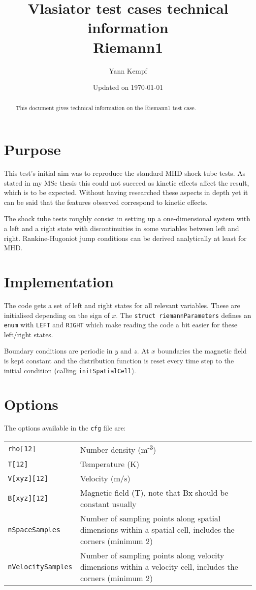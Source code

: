 \documentclass[a4paper,10pt]{scrartcl}
\title{
\Huge{Vlasiator test cases technical information} \\
\LARGE{Riemann1}
}
\author{Yann Kempf}
\date{Updated on \today}
\begin{document}
\maketitle

\begin{abstract}
   This document gives technical information on the Riemann1 test case.
\end{abstract}

\section{Purpose}
This test's initial aim was to reproduce the standard MHD shock tube tests. As stated in my MSc thesis this could not succeed as kinetic effects affect the result, which is to be expected. Without having researched these aspects in depth yet it can be said that the features observed correspond to kinetic effects.

The shock tube tests roughly consist in setting up a one-dimensional system with a left and a right state with discontinuities in some variables between left and right. Rankine-Hugoniot jump conditions can be derived analytically at least for MHD.


\section{Implementation}
The code gets a set of left and right states for all relevant variables. These are initialised depending on the sign of $x$. The \verb=struct riemannParameters= defines an \verb=enum= with \verb=LEFT= and \verb=RIGHT= which make reading the code a bit easier for these left/right states.

Boundary conditions are periodic in $y$ and $z$. At $x$ boundaries the magnetic field is kept constant and the distribution function is reset every time step to the initial condition (calling \verb=initSpatialCell=).

\section{Options}
The options available in the \verb=cfg= file are:

\begin{tabularx}{\textwidth}{lX}
   \verb=rho[12]= & Number density (m\textsuperscript{-3}) \\
   \verb=T[12]= & Temperature (K) \\
   \verb=V[xyz][12]= & Velocity (m/s) \\
   \verb=B[xyz][12]= & Magnetic field (T), note that Bx should be constant usually \\
   \verb=nSpaceSamples= & Number of sampling points along spatial dimensions within a spatial cell, includes the corners (minimum 2) \\
   \verb=nVelocitySamples= & Number of sampling points along velocity dimensions within a velocity cell, includes the corners (minimum 2)
\end{tabularx}
\end{document}
